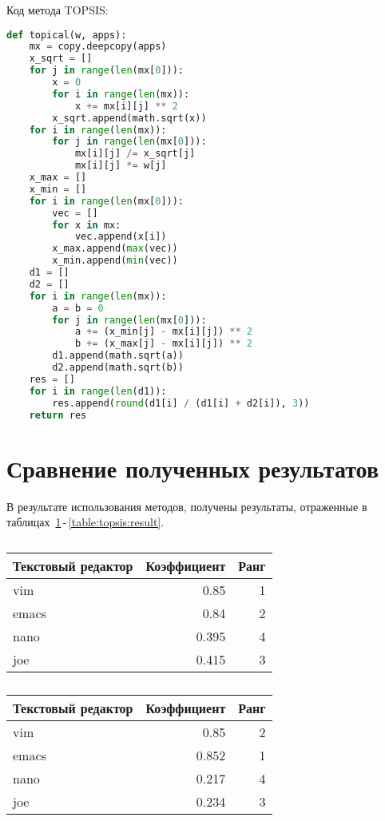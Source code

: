 Код метода TOPSIS:
\begin{lstlisting}[language=Python]
def topical(w, apps):
	mx = copy.deepcopy(apps)
	x_sqrt = []
	for j in range(len(mx[0])):
		x = 0
		for i in range(len(mx)):
			x += mx[i][j] ** 2
		x_sqrt.append(math.sqrt(x))
	for i in range(len(mx)):
		for j in range(len(mx[0])):
			mx[i][j] /= x_sqrt[j]
			mx[i][j] *= w[j]
	x_max = []
	x_min = []
	for i in range(len(mx[0])):
		vec = []
		for x in mx:
			vec.append(x[i])
		x_max.append(max(vec))
		x_min.append(min(vec))
	d1 = []
	d2 = []
	for i in range(len(mx)):
		a = b = 0
		for j in range(len(mx[0])):
			a += (x_min[j] - mx[i][j]) ** 2
			b += (x_max[j] - mx[i][j]) ** 2
		d1.append(math.sqrt(a))
		d2.append(math.sqrt(b))
	res = []
	for i in range(len(d1)):
		res.append(round(d1[i] / (d1[i] + d2[i]), 3))
	return res
\end{lstlisting}

\section{Сравнение полученных результатов}
В результате использования методов, получены результаты, отраженные
в таблицах~\ref{table:saw:result}\,-\,\ref{table:topsis:result}.

\begin{table}[h!tp]
	\centering
	\caption{}
	\label{table:saw:result}
	\begin{tabular}{|l|r|r|}
		\hline Текстовый редактор & Коэффициент & Ранг\\ \hline
		vim & 0.85 & 1\\ \hline
		emacs & 0.84 & 2\\ \hline
		nano & 0.395 & 4\\ \hline
		joe & 0.415 & 3\\ \hline
	\end{tabular}
\end{table}

\begin{table}[h!tp]
	\centering
	\caption{}
	\label{table:mout:result}
	\begin{tabular}{|l|r|r|}
		\hline Текстовый редактор & Коэффициент & Ранг\\ \hline
		vim & 0.85 & 2\\ \hline
		emacs & 0.852 & 1\\ \hline
		nano & 0.217 & 4\\ \hline
		joe & 0.234 & 3\\ \hline
	\end{tabular}
\end{table}

